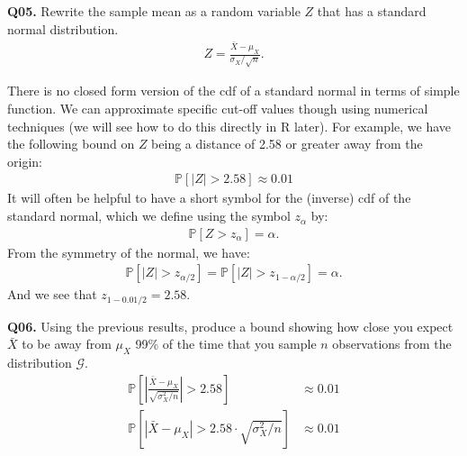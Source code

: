 \documentclass[12pt]{article}
\newcommand{\Prob}{\mathbb{P}}
\newcommand{\cblack}{\color{Black}}
\newcommand{\cblue}{\color{MidnightBlue}}
\begin{document}
\textbf{Q05.} Rewrite the sample mean as a random variable $Z$ that has a
standard normal distribution. \cblue
\begin{align*}
Z = \frac{\bar{X} - \mu_X}{\sigma_X / \sqrt{n}}.
\end{align*}

\cblack There is no closed form version of the cdf of a standard normal in
terms of simple function. We can approximate specific cut-off values though
using numerical techniques (we will see how to do this directly in R later).
For example, we have the following bound on $Z$ being a distance of 2.58 or
greater away from the origin:
\begin{align*}
\Prob \left[ |Z| > 2.58 \right] \approx 0.01
\end{align*}
It will often be helpful to have a short symbol for the (inverse) cdf of the
standard normal, which we define using the symbol $z_{\alpha}$ by:
\begin{align*}
\Prob \left[ Z > z_{\alpha} \right] = \alpha.
\end{align*}
From the symmetry of the normal, we have:
\begin{align*}
\Prob \left[ |Z| > z_{\alpha/2} \right] = \Prob \left[ |Z| > z_{1 - \alpha/2} \right] = \alpha.
\end{align*}
And we see that $z_{1 - 0.01/2} = 2.58$.

\textbf{Q06.} Using the previous results, produce a bound showing how close
you expect $\bar{X}$ to be away from $\mu_X$ 99\% of the time that you sample
$n$ observations from the distribution $\mathcal{G}$. \cblue
\begin{align*}
\Prob \left[ \left|\frac{\bar{X} - \mu_X}{\sqrt{\sigma_X^2 / n}} \right| > 2.58 \right] &\approx 0.01 \\
\Prob \left[ |\bar{X} - \mu_X| > 2.58 \cdot \sqrt{\sigma_X^2 / n} \right] &\approx 0.01
\end{align*}

\end{document}
